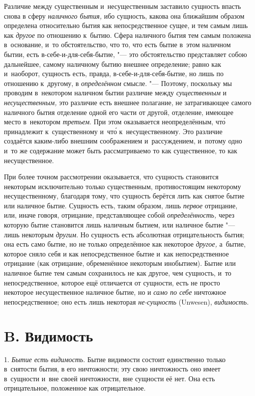 Различие между существенным и~несущественным заставило сущность впасть снова
в сферу {\em наличного бытия,} ибо сущность, какова она
ближайшим образом определена относительно бытия как непосредственное сущее,
и тем самым лишь как {\em другое} по отношению к~бытию.
Сфера наличного бытия тем самым положена в~основание, и~то обстоятельство,
что то, что есть бытие в~этом наличном бытии, есть в-себе-и-для-себя-бытие,
"--- это обстоятельство представляет собою дальнейшее, самому наличному бытию
внешнее определение; равно как и~наоборот, сущность есть, правда,
в-себе-и-для-себя-бытие, но лишь по отношению к~другому, в
{\em определённом} смысле. "--- Поэтому, поскольку мы
проводим в~некотором наличном бытии различие между
{\em существенным} и
{\em несущественным,} это различие есть внешнее
полагание, не затрагивающее самого наличного бытия отделение одной его
части от другой, отделение, имеющее место в~некотором
{\em третьем}. При этом оказывается неопределённым, чт\'{о} принадлежит
к~существенному и~чт\'{о} к~несущественному. Это различие создаётся
каким-либо внешним соображением и~рассуждением, и~потому одно и~то же
содержание может быть рассматриваемо то как существенное, то как
несущественное.

При более точном рассмотрении оказывается, что сущность становится некоторым
исключительно только существенным, противостоящим некоторому
несущественному, благодаря тому, что сущность берётся лить как снятое бытие
или наличное бытие. Сущность есть, таким образом, лишь
{\em первое} отрицание, или, иначе говоря, отрицание,
представляющее собой {\em определённость,} через
которую бытие становится лишь наличным бытием, или наличное бытие "--- лишь
некоторым {\em другим}. Но сущность есть абсолютная
отрицательность бытия; она есть само бытие, но не только определённое как
некоторое {\em другое,} а~бытие, которое сняло себя и
как непосредственное бытие и~как непосредственное отрицание (как отрицание,
обременённое некоторым инобытием). Бытие или наличное бытие тем самым
сохранилось не как другое, чем сущность, и~то непосредственное, которое ещё
отличается от сущности, есть не просто некоторое несущественное наличное
бытие, но и {\em само по себе} ничтожное
непосредственное; оно есть лишь некоторая
{\em не-сущность} (Unwesen),
{\em видимость}.

\section[B. Видимость]{B. Видимость}
1. {\em Бытие есть
видимость}. Бытие видимости состоит единственно только в~снятости бытия, в
его ничтожности; эту свою ничтожность оно имеет в~сущности и~вне своей
ничтожности, вне сущности её нет. Она есть отрицательное, положенное как
отрицательное.

